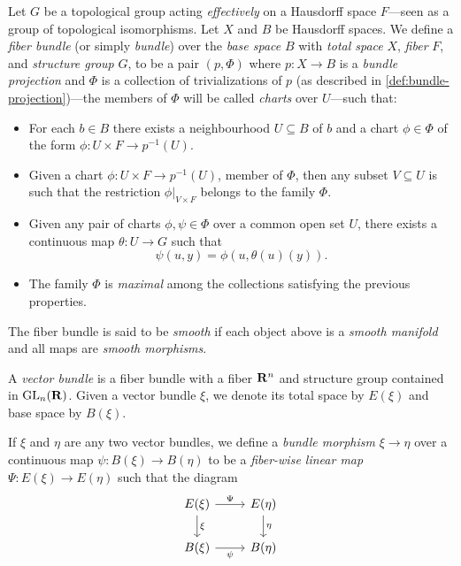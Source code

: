 \begin{definition}
\label{def:fiber-bundle}
Let \(G\) be a topological group acting \emph{effectively} on a Hausdorff space
\(F\)---seen as a group of topological isomorphisms. Let \(X\) and \(B\) be
Hausdorff spaces. We define a \emph{fiber bundle} (or simply \emph{bundle}) over
the \emph{base space} \(B\) with \emph{total space} \(X\), \emph{fiber} \(F\),
and \emph{structure group} \(G\), to be a pair \((p, \Phi)\) where
\(p: X \to B\) is a \emph{bundle projection} and \(\Phi\) is a collection of
trivializations of \(p\) (as described in \cref{def:bundle-projection})---the
members of \(\Phi\) will be called \emph{charts} over \(U\)---such that:
\begin{itemize}\setlength\itemsep{0em}
\item For each \(b \in B\) there exists a neighbourhood \(U \subseteq B\) of
  \(b\) and a chart \(\phi \in \Phi\) of the form
  \(\phi: U \times F \to p^{-1}(U)\).

\item Given a chart \(\phi: U \times F \to p^{-1}(U)\), member of \(\Phi\), then
  any subset \(V \subseteq U\) is such that the restriction
  \(\phi|_{V \times F}\) belongs to the family \(\Phi\).

\item Given any pair of charts \(\phi, \psi \in \Phi\) over a common open set
  \(U\), there exists a continuous map \(\theta: U \to G\) such that
  \[
  \psi(u, y) = \phi(u, \theta(u)(y)).
  \]

\item The family \(\Phi\) is \emph{maximal} among the collections satisfying the
  previous properties.
\end{itemize}
The fiber bundle is said to be \emph{smooth} if each object above is a
\emph{smooth manifold} and all maps are \emph{smooth morphisms}.
\end{definition}

\begin{definition}
\label{def:vector-bundle}
A \emph{vector bundle} is a fiber bundle with a fiber \(\mathbf{R}^n\) and structure
group contained in \(\operatorname{GL}_n(\mathbf{R})\). Given a vector bundle \(\xi\), we denote its
total space by \(E(\xi)\) and base space by \(B(\xi)\).
\end{definition}

\begin{definition}
\label{def:morphism-vector-bundles}
If \(\xi\) and \(\eta\) are any two vector bundles, we define a \emph{bundle
  morphism} \(\xi \to \eta\) over a continuous map \(\psi: B(\xi) \to B(\eta)\)
to be a \emph{fiber-wise linear map} \(\Psi: E(\xi) \to E(\eta)\) such that the
diagram
\[
\begin{tikzcd}
E(\xi) \ar[d, "\xi"] \ar[r, "\Psi"] &E(\eta) \ar[d, "\eta"] \\
B(\xi) \ar[r, "\psi"'] &B(\eta)
\end{tikzcd}
\]
\end{definition}

